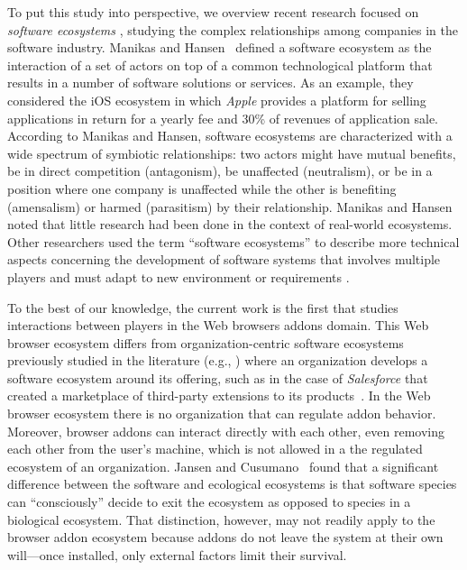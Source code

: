 \documentclass[10pt,letterpaper]{article}
\begin{document}
To put this study into perspective, we overview recent research focused on \textit{software ecosystems} \cite{messerschmitt2005software,dhungana2010software, manikas13,jansen13}, studying the complex relationships among companies in the software industry. Manikas and Hansen~\cite{manikas13} defined a software ecosystem as the interaction of a set of actors on top of a common technological platform that results in a number of software solutions or services. As an example, they considered the iOS ecosystem in which \textit{Apple} provides a platform for selling applications in return for a yearly fee and 30\% of revenues of application sale. According to Manikas and Hansen, software ecosystems are characterized with a wide spectrum of symbiotic relationships: two actors might have mutual benefits, be in direct competition (antagonism), be unaffected (neutralism), or be in a position where one company is unaffected while the other is benefiting (amensalism) or harmed (parasitism) by their relationship. Manikas and Hansen noted that little research had been done in the context of real-world ecosystems. Other researchers used the term ``software ecosystems'' to describe more technical aspects concerning the development of software systems that involves multiple players and must adapt to new environment or requirements \cite{lunguPhd09,blincoeMSR15}. 

To the best of our knowledge, the current work is the first that studies interactions between players in the Web browsers addons domain. This Web browser ecosystem differs from organization-centric software ecosystems previously studied in the literature (e.g., \cite{christensen2014analysis}) where an organization develops a software ecosystem around its offering, such as in the case of \textit{Salesforce} that created a marketplace of third-party extensions to its products~\cite{jansen2013defining}. In the Web browser ecosystem there is no organization that can regulate addon behavior. Moreover, browser addons can interact directly with each other, even removing each other from the user's machine, which is not allowed in a the regulated ecosystem of an organization. Jansen and Cusumano~\cite{jansen2013defining} found that a significant difference between the software and ecological ecosystems is that software species can ``consciously'' decide to exit the ecosystem as opposed to species in a biological ecosystem. That distinction, however, may not readily apply to the browser addon ecosystem because addons do not leave the system at their own will---once installed, only external factors limit their survival. 
\end{document}
